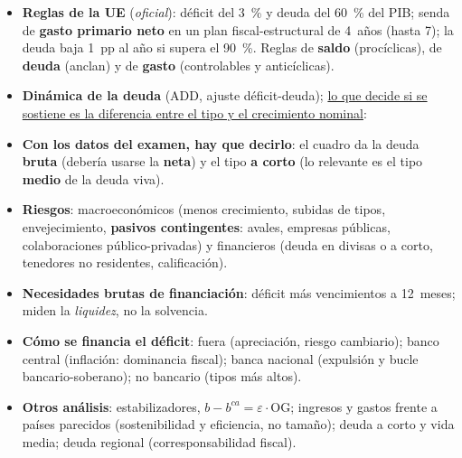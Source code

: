 \documentclass{article}
\begin{document}
\begin{columnas}
\begin{itemize}[itemsep=1.5pt]
\item \textbf{Reglas de la UE} (\emph{oficial}): déficit del 3~\% y deuda del 60~\% del PIB; senda de \textbf{gasto primario neto} en un plan fiscal-estructural de 4~años (hasta 7); la deuda baja 1~pp al año si supera el 90~\%. Reglas de \textbf{saldo} (procíclicas), de \textbf{deuda} (anclan) y de \textbf{gasto} (controlables y anticíclicas).
\item \textbf{Dinámica de la deuda} (ADD, ajuste déficit-deuda); \uline{lo que decide si se sostiene es la diferencia entre el tipo y el crecimiento nominal}:
\end{itemize}
\begin{itemize}[itemsep=1.5pt]
\item \textbf{Con los datos del examen, hay que decirlo}: el cuadro da la deuda \textbf{bruta} (debería usarse la \textbf{neta}) y el tipo \textbf{a corto} (lo relevante es el tipo \textbf{medio} de la deuda viva).
\item \textbf{Riesgos}: macroeconómicos (menos crecimiento, subidas de tipos, envejecimiento, \textbf{pasivos contingentes}: avales, empresas públicas, colaboraciones público-privadas) y financieros (deuda en divisas o a corto, tenedores no residentes, calificación).
\item \textbf{Necesidades brutas de financiación}: déficit más vencimientos a 12~meses; miden la \emph{liquidez}, no la solvencia.
\item \textbf{Cómo se financia el déficit}: fuera (apreciación, riesgo cambiario); banco central (inflación: dominancia fiscal); banca nacional (expulsión y bucle bancario-soberano); no bancario (tipos más altos).
\end{itemize}
\begin{itemize}[itemsep=1.5pt]
\item \textbf{Otros análisis}: estabilizadores, $b-b^{ca}=\varepsilon\cdot\mathrm{OG}$; ingresos y gastos frente a países parecidos (sostenibilidad y eficiencia, no tamaño); deuda a corto y vida media; deuda regional (corresponsabilidad fiscal).

\end{itemize}
\end{columnas}
\end{document}
